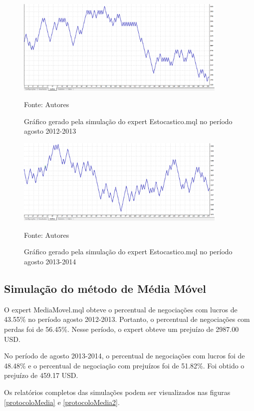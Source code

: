 \begin{figure}[htp]
\centering
\includegraphics[width=0.9\textwidth]{figuras/protocoloEst3}
\caption{Gráfico gerado pela simulação do expert Estocastico.mql no período agosto 2012-2013}{Fonte: Autores} 
\label{protocoloEst3}
\end{figure}

\begin{figure}[htp]
\centering
\includegraphics[width=0.9\textwidth]{figuras/protocoloEst4}
\caption{Gráfico gerado pela simulação do expert Estocastico.mql no período agosto 2013-2014}{Fonte: Autores} 
\label{protocoloEst4}
\end{figure}

\subsection{Simulação do método de Média Móvel}

O expert MediaMovel.mql obteve o percentual de negociações com lucros de 43.55\% no período agosto 2012-2013. Portanto, o percentual de negociações com perdas foi de 56.45\%. Nesse período, o expert obteve um prejuízo de 2987.00 USD. 

No período de agosto 2013-2014, o percentual de negociações com lucros foi de 48.48\% e o percentual de negociação com prejuízos foi de 51.82\%.  Foi obtido o prejuízo de 459.17 USD. 

Os relatórios completos das simulações podem ser visualizados nas figuras \ref{protocoloMedia} e \ref{protocoloMedia2}.

